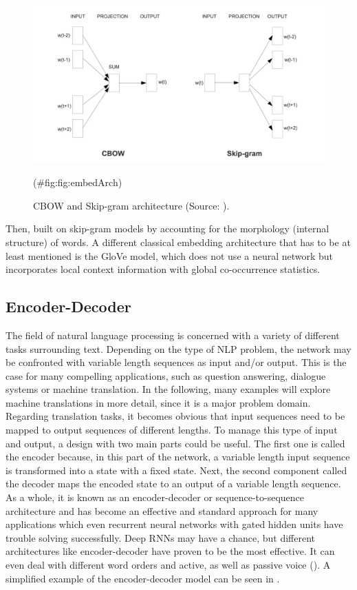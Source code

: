 \documentclass[
]{krantz}
\begin{document}
\begin{figure}

{\centering \includegraphics[width=0.85\linewidth]{./figures/01-01-nlp/embed_arch_mikolov_p5} 

}

\caption{CBOW and Skip-gram architecture (Source: \citet{mikolov2013efficient}).}(\#fig:fig:embedArch)
\end{figure}



Then, \citep{Bojanowski2016} built on skip-gram models by accounting for the
morphology (internal structure) of words. A different classical
embedding architecture that has to be at least mentioned is the GloVe
model, which does not use a neural network but incorporates local
context information with global co-occurrence statistics.

\hypertarget{encoder-decoder}{%
\subsection{Encoder-Decoder}\label{encoder-decoder}}

The field of natural language processing is concerned with a variety of
different tasks surrounding text. Depending on the type of NLP problem,
the network may be confronted with variable length sequences as input
and/or output. This is the case for many compelling applications, such
as question answering, dialogue systems or machine translation. In the
following, many examples will explore machine translations in more
detail, since it is a major problem domain. Regarding translation tasks,
it becomes obvious that input sequences need to be mapped to output
sequences of different lengths. To manage this type of input and output,
a design with two main parts could be useful. The first one is called
the encoder because, in this part of the network, a variable length
input sequence is transformed into a state with a fixed state. Next, the
second component called the decoder maps the encoded state to an output
of a variable length sequence. As a whole, it is known as an
encoder-decoder or sequence-to-sequence architecture and has become an
effective and standard approach for many applications which even
recurrent neural networks with gated hidden units have trouble solving
successfully. Deep RNNs may have a chance, but different architectures
like encoder-decoder have proven to be the most effective. It can even
deal with different word orders and active, as well as passive voice
(\citep{Sutskever2014}). A simplified example of the encoder-decoder model
can be seen in .
\end{document}
